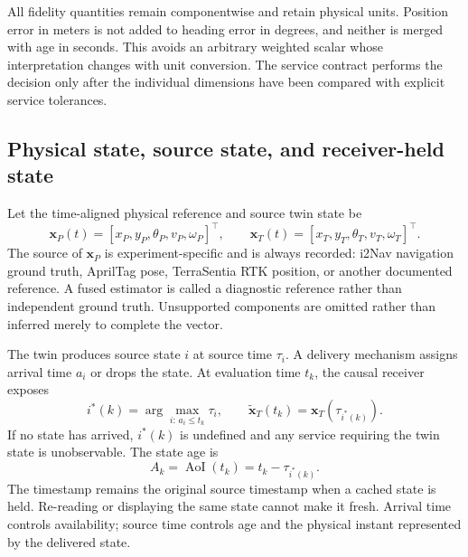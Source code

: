 \documentclass[journal,onecolumn]{IEEEtran}
\begin{document}
All fidelity quantities remain componentwise and retain physical units. Position error in meters is not added to heading error in degrees, and neither is merged with age in seconds. This avoids an arbitrary weighted scalar whose interpretation changes with unit conversion. The service contract performs the decision only after the individual dimensions have been compared with explicit service tolerances.

\subsection{Physical state, source state, and receiver-held state}
Let the time-aligned physical reference and source twin state be
\begin{equation}
\mathbf{x}_{P}(t)=
[x_P,y_P,\theta_P,v_P,\omega_P]^\top,
\qquad
\mathbf{x}_{T}(t)=
[x_T,y_T,\theta_T,v_T,\omega_T]^\top .
\end{equation}
The source of $\mathbf{x}_{P}$ is experiment-specific and is always recorded: i2Nav navigation ground truth, AprilTag pose, TerraSentia RTK position, or another documented reference. A fused estimator is called a diagnostic reference rather than independent ground truth. Unsupported components are omitted rather than inferred merely to complete the vector.

The twin produces source state $i$ at source time $\tau_i$. A delivery mechanism assigns arrival time $a_i$ or drops the state. At evaluation time $t_k$, the causal receiver exposes
\begin{equation}
i^*(k)=\arg\max_{i:\,a_i\le t_k}\tau_i,
\qquad
\widetilde{\mathbf{x}}_T(t_k)=\mathbf{x}_T(\tau_{i^*(k)}).
\end{equation}
If no state has arrived, $i^*(k)$ is undefined and any service requiring the twin state is unobservable. The state age is
\begin{equation}
A_k=\operatorname{AoI}(t_k)=t_k-\tau_{i^*(k)}.
\end{equation}
The timestamp remains the original source timestamp when a cached state is held. Re-reading or displaying the same state cannot make it fresh. Arrival time controls availability; source time controls age and the physical instant represented by the delivered state.
\end{document}

